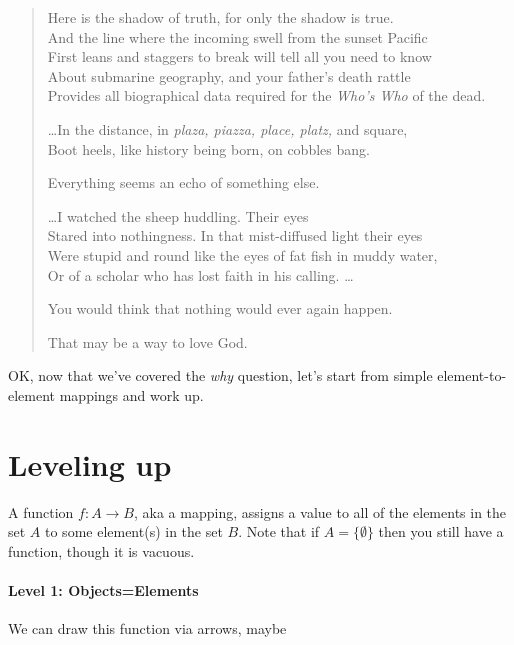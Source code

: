 \documentclass[11pt]{article}
\begin{document}
\begin{verse}
Here is the shadow of truth, for only the shadow is true.\\
And the line where the incoming swell from the sunset Pacific\\
First leans and staggers to break will tell all you need to know\\
About submarine geography, and your father's death rattle\\
Provides all biographical data required for the {\em Who's Who} of the dead.

\dots In the distance, in {\em plaza, piazza, place, platz,} and square,\\
Boot heels, like history being born, on cobbles bang.

Everything seems an echo of something else.

\dots I watched the sheep huddling.  Their eyes\\
Stared into nothingness.  In that mist-diffused light their eyes\\
Were stupid and round like the eyes of fat fish in muddy water,\\
Or of a scholar who has lost faith in his calling. \dots

You would think that nothing would ever again happen.

That may be a way to love God.
\end{verse}

OK, now that we've covered the {\em why} question, let's start from simple element-to-element
mappings and work up.

\section{Leveling up}\label{levelsec}

A function $f:A\to B$, aka a mapping, assigns a value to all of the elements in the set $A$ to
some element(s) in the set $B$. Note that if $A=\{\emptyset\}$ then you still have a function, though
it is vacuous.

\paragraph{Level 1: Objects=Elements}
We can draw this function via arrows, maybe

\begin{center}
\end{center}
\end{document}
